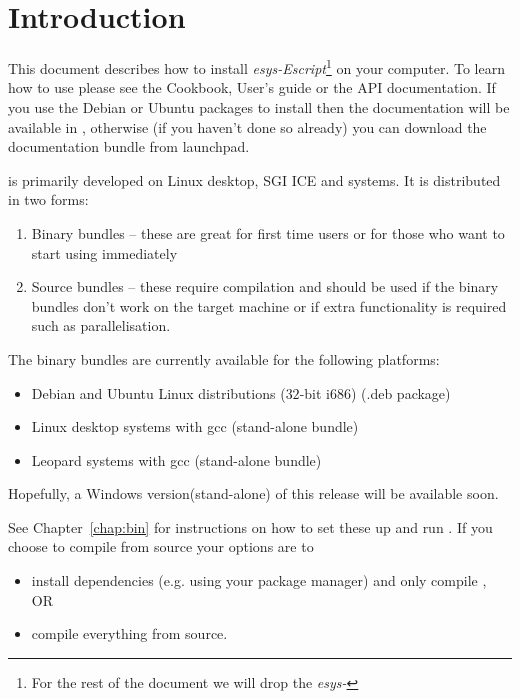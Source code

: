 %
%
%

\chapter{Introduction}
This document describes how to install \emph{esys-Escript}\footnote{For the rest of the document we will drop the \emph{esys-}} on your computer.
To learn how to use \esfinley please see the Cookbook, User's guide or the API documentation.
If you use the Debian or Ubuntu packages to install then the documentation will be available in
, otherwise (if you haven't done so already) you can download the documentation bundle 
from launchpad.

\esfinley is primarily developed on Linux desktop, SGI ICE and \macosx systems.
It is distributed in two forms:
\begin{enumerate}
    \item Binary bundles -- these are great for first time users or for those who want to start using \esfinley immediately
    \item Source bundles -- these require compilation and should be used if the binary bundles don't work on the target machine or if extra functionality is required such as \mpi parallelisation.
\end{enumerate}

The binary bundles are currently available for the following platforms:
\begin{itemize}
    \item Debian and Ubuntu Linux distributions ($32$-bit i686) (.deb package)
    \item Linux desktop systems with gcc (stand-alone bundle)
    \item \macosx Leopard systems with gcc (stand-alone bundle)
\end{itemize}

Hopefully, a Windows version(stand-alone) of this release will be available soon.

See Chapter~\ref{chap:bin} for instructions on how to set these up and run \esfinley.
If you choose to compile from source your options are to
\begin{itemize}
    \item install dependencies (e.g. using your package manager) and only compile \esfinley, OR
    \item compile everything from source.
\end{itemize}

